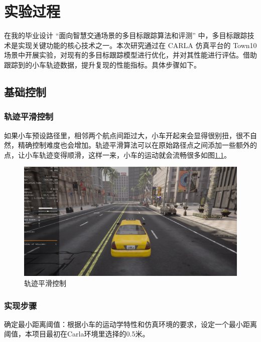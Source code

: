 \chapter{实验过程}

在我的毕业设计 “面向智慧交通场景的多目标跟踪算法和评测” 中，多目标跟踪技术是实现关键功能的核心技术之一。本次研究通过在 CARLA 仿真平台的 Town10 场景中开展实验，对现有的多目标跟踪模型进行优化，并对其性能进行评估。借助跟踪到的小车轨迹数据，提升复现的性能指标。具体步骤如下。

\section{基础控制}
\subsection{轨迹平滑控制}

如果小车预设路径里，相邻两个航点间距过大，小车开起来会显得很别扭，很不自然，精确控制难度也会增加。轨迹平滑算法可以在原始路径点之间添加一些额外的点，让小车轨迹变得顺滑，这样一来，小车的运动就会流畅很多如图\ref{fig:p9}。


\begin{figure}[htbp] %
	\centering
	\includegraphics[width=1\textwidth]{p9} %
	\caption{轨迹平滑控制} %
	\label{fig:p9} %
\end{figure}






\subsection{实现步骤}

确定最小距离阈值：根据小车的运动学特性和仿真环境的要求，设定一个最小距离阈值，本项目最初在Carla环境里选择的0.5米。

